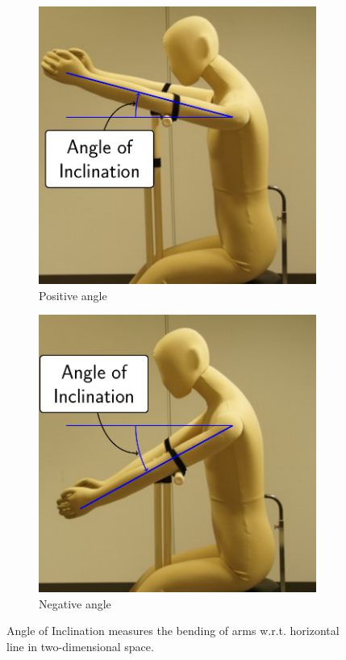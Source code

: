 \documentclass[sigconf]{acmart}
\begin{document}
\begin{figure}
	\centering
	\begin{subfigure}{.5\linewidth}
		\includegraphics[width=.9\linewidth]{inclination_plus}
		\caption{Positive angle}
	\end{subfigure}%
	\begin{subfigure}{.5\linewidth}
		\includegraphics[width=.9\linewidth]{inclination_minus}
		\caption{Negative angle}
	\end{subfigure}
	\caption{Angle of Inclination measures the bending of arms w.r.t. horizontal line in two-dimensional space.}
	\label{fig:inclination}
\end{figure}
\end{document}
